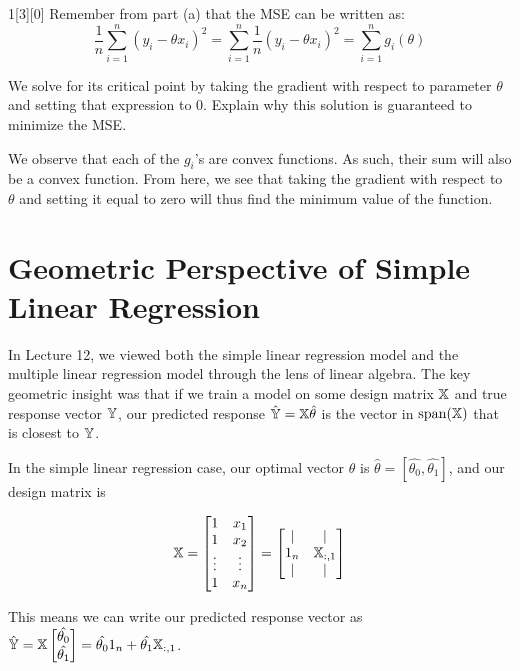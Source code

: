 \documentclass{article}
\begin{document}
\begin{dshw}{1}[3][0]
	Remember from part (a) that the MSE can be written as:
	$$\frac{1}{n}\sum_{i=1}^n (y_i - \theta x_i)^2 = \sum_{i=1}^n \frac{1}{n}(y_i - \theta x_i)^2 = \sum_{i=1}^{n} g_i(\theta)$$
	
	We solve for its critical point by taking the gradient with respect to parameter $\theta$ and setting that expression to $0$. Explain why this solution is guaranteed to minimize the MSE.
\end{dshw}
\begin{solution}
	We observe that each of the $g_{i}$'s are convex functions. As such, their sum will also be a convex function. From here, we see that taking the gradient with respect to $\theta$ and setting it equal to zero will thus find the minimum value of the function.
\end{solution}

\newpage

\section{Geometric Perspective of Simple Linear Regression}
In Lecture 12, we viewed both the simple linear regression model and the multiple linear regression model through the lens of linear algebra. The key geometric insight was that if we train a model on some design matrix $\Bbb{X}$ and true response vector $\Bbb{Y}$, our predicted response $\hat{\Bbb{Y}} = \Bbb{X} \hat{\theta}$ is the vector in $\text{span}(\Bbb{X})$ that is closest to $\Bbb{Y}$. 

In the simple linear regression case, our optimal vector $\theta$ is $\hat{\theta} = [\hat{\theta_0}, \hat{\theta_1}]$, and our design matrix is

$$\Bbb{X} = \begin{bmatrix} 1 & x_1 \\ 1 & x_2 \\ \vdots & \vdots \\ 1 & x_n \end{bmatrix} = \begin{bmatrix} | & | \\ 1_n & \Bbb{X}_{:,1} \\ | & | \end{bmatrix}$$

This means we can write our predicted response vector as $\hat{\Bbb{Y}} = \Bbb{X} \begin{bmatrix} \hat{\theta_0} \\ \hat{\theta_1} \end{bmatrix} = \hat{\theta_0} 1_n + \hat{\theta_1} \Bbb{X}_{:,1}$. 
\end{document}
